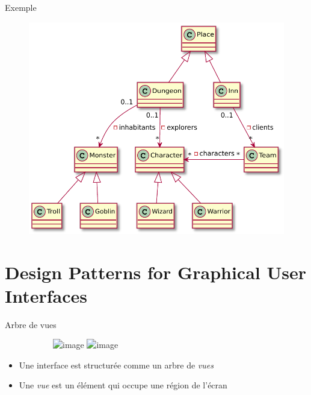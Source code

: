 \documentclass[xcolor=table]{beamer}
\begin{document}
\begin{frame}{Exemple}
\begin{figure}
    \centering
    \includegraphics[scale=0.6]{fig/game.pdf}
\end{figure}
\end{frame}

\section{Design Patterns for Graphical User Interfaces}

\begin{frame}{Arbre de vues}
\begin{figure}
\begin{subfigure}{0.48\linewidth}
    \centering
    \includegraphics<1>[scale=0.32]{fig/ui-example.jpeg}
    \includegraphics<2>[scale=0.32]{fig/ui-view-tree-example.jpeg}
\end{subfigure}
\begin{subfigure}{0.48\linewidth}
    \centering
\end{subfigure}
\end{figure}
\begin{itemize}
    \item Une interface est structurée comme un arbre de \emph{vues}
    \item Une \emph{vue} est un élément qui occupe une région de l'écran
\end{itemize}
\end{frame}
\end{document}
